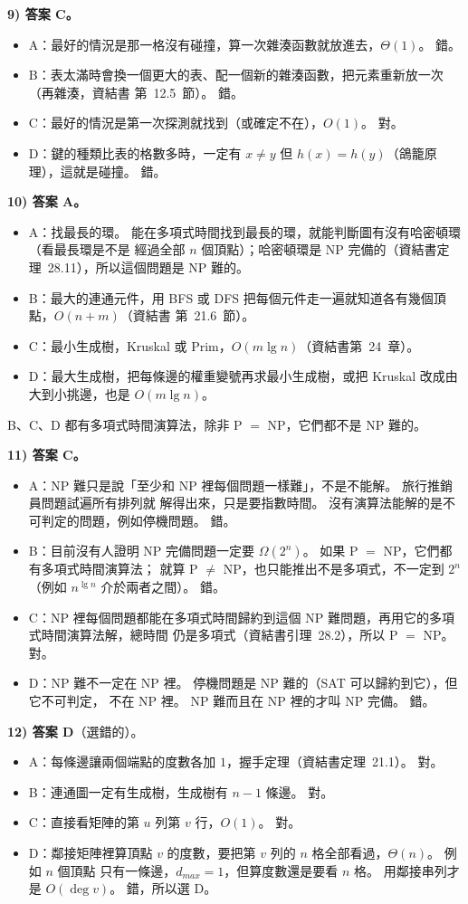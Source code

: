 \begin{pastsoln}
\textbf{9) 答案 C。}
\begin{itemize}
\item A：最好的情況是那一格沒有碰撞，算一次雜湊函數就放進去，$\Theta(1)$。 錯。
\item B：表太滿時會換一個更大的表、配一個新的雜湊函數，把元素重新放一次（再雜湊，資結書
第~12.5~節）。 錯。
\item C：最好的情況是第一次探測就找到（或確定不在），$O(1)$。 對。
\item D：鍵的種類比表的格數多時，一定有 $x \ne y$ 但 $h(x) = h(y)$（鴿籠原理），這就是碰撞。 錯。
\end{itemize}

\textbf{10) 答案 A。}
\begin{itemize}
\item A：找最長的環。 能在多項式時間找到最長的環，就能判斷圖有沒有哈密頓環（看最長環是不是
經過全部 $n$ 個頂點）；哈密頓環是 NP 完備的（資結書定理~28.11），所以這個問題是 NP 難的。
\item B：最大的連通元件，用 BFS 或 DFS 把每個元件走一遍就知道各有幾個頂點，$O(n + m)$（資結書
第~21.6~節）。
\item C：最小生成樹，Kruskal 或 Prim，$O(m \lg n)$（資結書第~24~章）。
\item D：最大生成樹，把每條邊的權重變號再求最小生成樹，或把 Kruskal 改成由大到小挑邊，也是
$O(m \lg n)$。
\end{itemize}
B、C、D 都有多項式時間演算法，除非 P $=$ NP，它們都不是 NP 難的。

\textbf{11) 答案 C。}
\begin{itemize}
\item A：NP 難只是說「至少和 NP 裡每個問題一樣難」，不是不能解。 旅行推銷員問題試遍所有排列就
解得出來，只是要指數時間。 沒有演算法能解的是不可判定的問題，例如停機問題。 錯。
\item B：目前沒有人證明 NP 完備問題一定要 $\Omega(2^n)$。 如果 P $=$ NP，它們都有多項式時間演算法；
就算 P $\ne$ NP，也只能推出不是多項式，不一定到 $2^n$（例如 $n^{\lg n}$ 介於兩者之間）。 錯。
\item C：NP 裡每個問題都能在多項式時間歸約到這個 NP 難問題，再用它的多項式時間演算法解，總時間
仍是多項式（資結書引理~28.2），所以 P $=$ NP。 對。
\item D：NP 難不一定在 NP 裡。 停機問題是 NP 難的（\textsc{SAT} 可以歸約到它），但它不可判定，
不在 NP 裡。 NP 難而且在 NP 裡的才叫 NP 完備。 錯。
\end{itemize}

\textbf{12) 答案 D}（選錯的）。
\begin{itemize}
\item A：每條邊讓兩個端點的度數各加 $1$，握手定理（資結書定理~21.1）。 對。
\item B：連通圖一定有生成樹，生成樹有 $n - 1$ 條邊。 對。
\item C：直接看矩陣的第 $u$ 列第 $v$ 行，$O(1)$。 對。
\item D：鄰接矩陣裡算頂點 $v$ 的度數，要把第 $v$ 列的 $n$ 格全部看過，$\Theta(n)$。 例如 $n$ 個頂點
只有一條邊，$d_{max} = 1$，但算度數還是要看 $n$ 格。 用鄰接串列才是 $O(\deg v)$。 錯，所以選 D。
\end{itemize}
\end{pastsoln}
